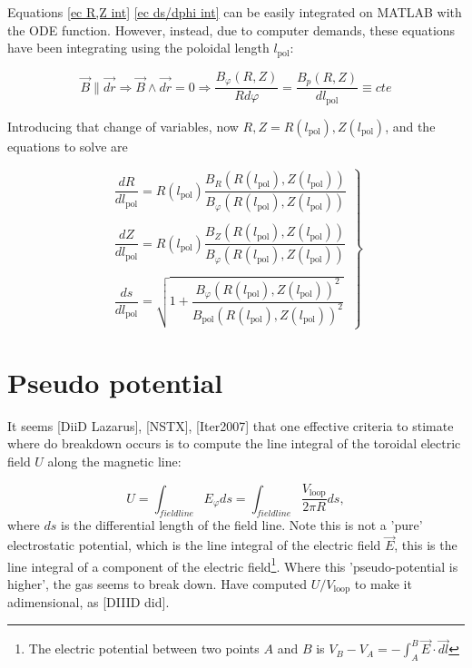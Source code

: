 \documentclass[a4paper,12pt,oneside]{book}
\begin{document}
Equations \eqref{ec R,Z int} \eqref{ec ds/dphi int} can be easily integrated on MATLAB with the ODE function. However, instead, due to computer demands, these equations have been integrating using the poloidal length $l_\text{pol}$:

\begin{equation}
\vec{B} \parallel \vec{dr} \Rightarrow\vec{B} \wedge \vec{dr}=0 \Rightarrow \dfrac{B_{\varphi}(R,Z)}{R d\varphi}= \dfrac{B_p(R,Z)}{d l_\text{pol}} \equiv cte
\end{equation}

Introducing that change of variables, now $R,Z=R(l_\text{pol}),Z(l_\text{pol})$, and the equations to solve are

\begin{equation}
	\left.
	\begin{array}{c}
	\dfrac{dR}{d l_\text{pol}}=R(l_\text{pol}) \dfrac{B_R(R(l_\text{pol}),Z(l_\text{pol}))}{B_\varphi (R(l_\text{pol}),Z(l_\text{pol}))} \\ 
	\\
\dfrac{dZ}{d l_\text{pol}}=R(l_\text{pol}) \dfrac{B_Z(R(l_\text{pol}),Z(l_\text{pol}))}{B_\varphi(R(l_\text{pol}),Z(l_\text{pol}))}  \\
	\\
	\dfrac{ds}{d l_\text{pol}}= \sqrt{1+\dfrac{B_\varphi (R(l_\text{pol}),Z(l_\text{pol}))^2}{B_\text{pol}(R(l_\text{pol}),Z(l_\text{pol}))^2}}
	\end{array}
	\right\}
\end{equation}

\section{Pseudo potential}

It seems [DiiD Lazarus], [NSTX], [Iter2007] that one effective criteria to stimate where do breakdown occurs is to compute the line integral of the toroidal electric field $U$ along the magnetic line:

\begin{equation}
U= \int_{field line} E_\varphi ds= \int_{field line} \dfrac{V_\text{loop}}{2 \pi R} ds,
\end{equation}
where $ds$ is the differential length of the field line. Note this is not a 'pure' electrostatic potential, which is the line integral of the electric field $\vec{E}$, this is the line integral of a component of the electric field\footnote{The electric potential between two points $A$ and $B$ is $V_B-V_A=- \int_A^B \vec{E} \cdot \vec{dl}$}. Where this 'pseudo-potential is higher', the gas seems to break down. Have computed $U/V_\text{loop}$ to make it adimensional, as [DIIID did].
\end{document}
